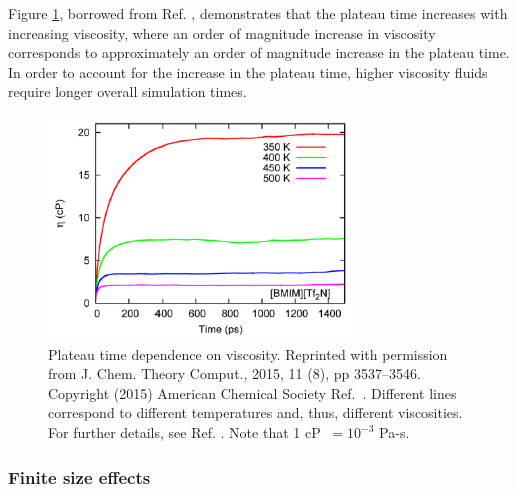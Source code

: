 \documentclass[9pt,bestpractices]{livecoms}
\begin{document}
Figure \ref{fig:ZhangFig10}, borrowed from Ref. \cite{Zhang2015}, demonstrates that the plateau time increases with increasing viscosity, where an order of magnitude increase in viscosity corresponds to approximately an order of magnitude increase in the plateau time. In order to account for the increase in the plateau time, higher viscosity fluids require longer overall simulation times.

\begin{figure}[htb!]
	\centering
	\includegraphics[width=3.2in]{ZhangFig10.png}
	\caption{Plateau time dependence on viscosity. Reprinted with permission from J. Chem. Theory Comput., 2015, 11 (8), pp 3537–3546. Copyright (2015) American Chemical Society Ref.\ \cite{Zhang2015}. Different lines correspond to different temperatures and, thus, different viscosities. For further details, see Ref. \cite{Zhang2015}. Note that 1 cP $\ = 10^{-3}$ Pa-s.}
	\label{fig:ZhangFig10}
\end{figure}



\subsubsection{Finite size effects} \label{sec:Viscosity:General: Finite size}

\end{document}
